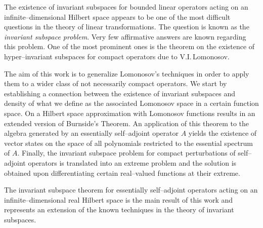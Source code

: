 


The existence of invariant subspaces for bounded linear operators acting on
an infinite--dimensional Hilbert space appears to be one of the most
difficult questions in the theory of linear transformations. The question is
known as the {\em invariant subspace problem}. Very few affirmative answers
are known regarding this problem. One of the most prominent ones is the
theorem on the existence of hyper--invariant subspaces for compact operators
due to V.I.\,Lomonosov.

\smallskip

The aim of this work is to generalize Lomonosov's techniques in order to
apply them to a wider class of not necessarily compact operators. We start by
establishing a connection between the existence of invariant subspaces and
density of what we define as the associated Lomonosov space in a certain
function space. On a Hilbert space approximation with Lomonosov functions
results in an extended version of Burnside's Theorem. An application of this
theorem to the algebra generated by an essentially self--adjoint operator $A$
yields the existence of vector states on the space of all polynomials
restricted to the essential spectrum of $A$. Finally, the invariant subspace
problem for compact perturbations of self--adjoint operators is translated
into an extreme problem and the solution is obtained upon differentiating
certain real--valued functions at their extreme.

\smallskip

The invariant subspace theorem for essentially self--adjoint operators acting
on an infinite--dimensional real Hilbert space is the main result of this
work and represents an extension of the known techniques in the theory of
invariant subspaces.

